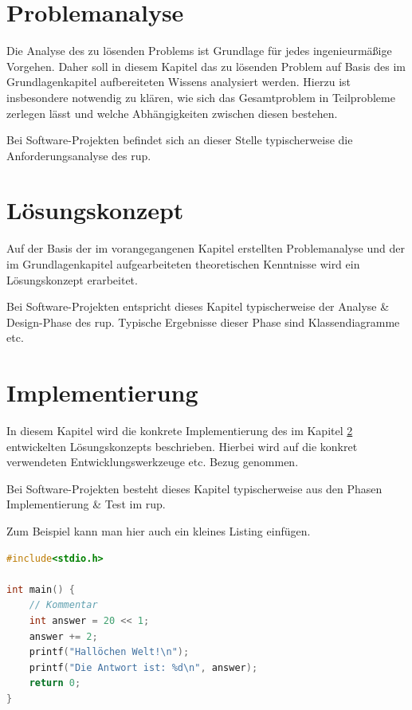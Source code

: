 \documentclass[oneside]{ausarbeitung}
\begin{document}
\chapter{Problemanalyse}
\label{cha:problemanalyse}

Die Analyse des zu lösenden Problems ist Grundlage für jedes 
ingenieurmäßige Vorgehen. Daher soll in diesem Kapitel das zu lösenden 
Problem auf Basis des im Grundlagenkapitel aufbereiteten Wissens 
analysiert werden. Hierzu ist insbesondere notwendig zu klären, wie sich 
das Gesamtproblem in Teilprobleme zerlegen lässt und welche 
Abhängigkeiten zwischen diesen bestehen.

Bei Software-Projekten befindet sich an dieser Stelle typischerweise die 
Anforderungsanalyse des \ac{rup}.

\chapter{Lösungskonzept}
\label{cha:loesungskonzept}

Auf der Basis der im vorangegangenen Kapitel erstellten Problemanalyse 
und der im Grundlagenkapitel aufgearbeiteten theoretischen Kenntnisse 
wird ein Lösungskonzept erarbeitet.

Bei Software-Projekten entspricht dieses Kapitel typischerweise der 
Analyse \& Design-Phase des \ac{rup}. Typische Ergebnisse dieser Phase sind 
Klassendiagramme etc.

\chapter{Implementierung}
\label{cha:implementierung}

In diesem Kapitel wird die konkrete Implementierung des im Kapitel
\ref{cha:loesungskonzept} entwickelten Lösungskonzepts beschrieben.
Hierbei wird auf die konkret verwendeten Entwicklungswerkzeuge etc. 
Bezug genommen.

Bei Software-Projekten besteht dieses Kapitel typischerweise aus den 
Phasen Implementierung \& Test im \ac{rup}.

Zum Beispiel kann man hier auch ein kleines Listing einfügen.

\begin{lstlisting}[language=c,%
                   caption={Überschrift des Quelltexts}]
#include<stdio.h>

int main() {
    // Kommentar
    int answer = 20 << 1;
    answer += 2;
    printf("Hallöchen Welt!\n");
    printf("Die Antwort ist: %d\n", answer);
    return 0;
}
\end{lstlisting}
\end{document}
